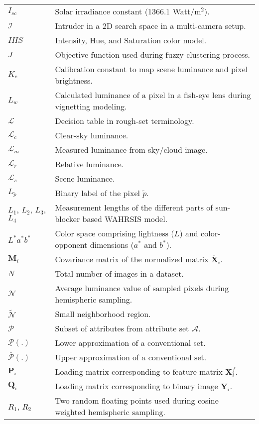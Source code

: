 \begin{longtable}[l]{p{80pt}p{320pt}}
$I_{sc}$ & Solar irradiance constant ($1366.1$ Watt/$\mbox{m}^2$). \\
$\mathcal{I}$ & Intruder in a 2D search space in a multi-camera setup.\\ 
$IHS$ & Intensity, Hue, and Saturation color model. \\
$J$ & Objective function used during fuzzy-clustering process. \\
$K_c$ & Calibration constant to map scene luminance and pixel brightness.\\
$L_w$ & Calculated luminance of a pixel in a fish-eye lens during vignetting modeling. \\
$\mathcal{L}$ & Decision table in rough-set terminology. \\
$\mathcal{L}_c$ & Clear-sky luminance. \\
$\mathcal{L}_m$ & Measured luminance from sky/cloud image. \\
$\mathcal{L}_r$ & Relative luminance. \\
$\mathcal{L}_s$ & Scene luminance. \\
$L_{\tilde{p}}$ & Binary label of the pixel $\tilde{p}$. \\
$L_{1}$, $L_{2}$, $L_{3}$, $L_{4}$  & Measurement lengths of the different parts of sun-blocker based WAHRSIS model. \\
$L^{*}a^{*}b^{*}$ & Color space comprising lightness ($L$) and color-opponent dimensions ($a^{*}$ and $b^{*}$). \\
$\mathbf{M}_i$  & Covariance matrix of the normalized matrix $\ddot{\mathbf{X}_{i}}$. \\
$N$ & Total number of images in a dataset. \\
$\mathcal{N}$ & Average luminance value of sampled pixels during hemispheric sampling. \\
$\tilde{\mathcal{N}}$ & Small neighborhood region. \\
$\mathcal{P}$ & Subset of attributes from attribute set $\mathcal{A}$.\\
$\underline{\mathcal{P}}(.)$ & Lower approximation of a conventional set.\\
$\overline{\mathcal{P}}(.)$ & Upper approximation of a conventional set.\\
$\mathbf{P}_{i}$ & Loading matrix corresponding to feature matrix $\mathbf{X}^{f}_{i}$. \\
$\mathbf{Q}_{i}$ & Loading matrix corresponding to binary image $\mathbf{Y}_{i}$. \\
$R_1$, $R_2$ & Two random floating points used during cosine weighted hemispheric sampling.\\

\end{longtable}
